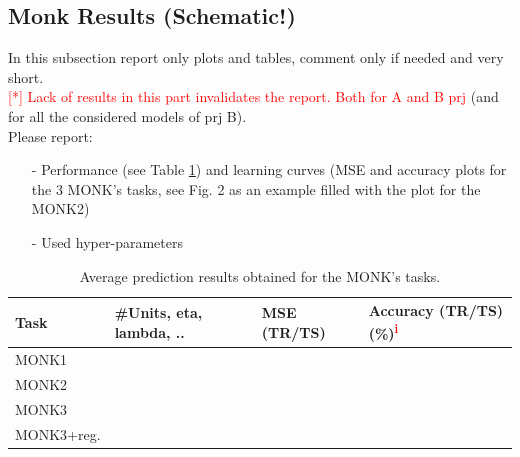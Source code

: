 \documentclass[12pt, letterpaper]{article}  %
\begin{document}
\vspace{-0.3cm}\subsection{Monk Results (Schematic!)}
In this subsection report only plots and tables, comment only if needed and very short. \\
\textcolor{red}{[*] Lack of results in this part invalidates the report.  Both for A and B prj} (and for all the considered models of prj B). \\
Please report:
\vspace{-0.4cm}\begin{itemize}
    \setlength\itemsep{-0.5em}
    \item[-] Performance (see Table \ref{tab:monk-table}) and learning curves (MSE and accuracy plots for the 3 MONK’s tasks, see Fig. 2 as an example filled with the plot for the MONK2)
    \item[-] Used hyper-parameters
\end{itemize}
\vspace{-0.5cm}\begin{table}[h]
\centering
\small
\begin{tabular}{|l|l|l|l|}
\hline
\textbf{Task} & \textbf{\#Units, eta, lambda, ..} & \textbf{MSE (TR/TS)} & \textbf{Accuracy (TR/TS)(\%)\textsuperscript{\textcolor{red}{i}}} \\ \hline
MONK1         &                                   &                      &                                \\ \hline
MONK2         &                                   &                      &                                \\ \hline
MONK3         &                                   &                      &                                \\ \hline
MONK3+reg. &                                   &                      &                                \\ \hline
\end{tabular}
\caption{Average prediction results obtained for the MONK’s tasks.}
\label{tab:monk-table}
\end{table}
\end{document}
